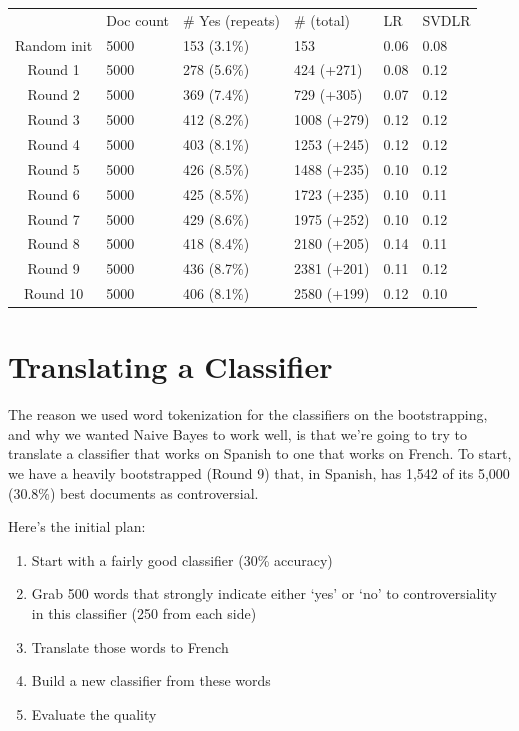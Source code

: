 \documentclass[11pt]{article} %
\begin{document}
\begin{tabular}{|c|*{5}{l|}}
\rowcolor{gray!50} & Doc count & \# Yes (repeats) & \# (total) & LR & SVDLR \\
Random init & 5000 & 153 (3.1\%) & 153 & 0.06 & 0.08 \\
Round 1 & 5000 & 278 (5.6\%) & 424 (+271) & 0.08 & 0.12 \\
Round 2 & 5000 & 369 (7.4\%) & 729 (+305) & 0.07 & 0.12 \\
Round 3 & 5000 & 412 (8.2\%) & 1008 (+279) & 0.12 & 0.12 \\
Round 4 & 5000 & 403 (8.1\%) & 1253 (+245) & 0.12 & 0.12 \\
Round 5 & 5000 & 426 (8.5\%) & 1488 (+235) & 0.10 & 0.12 \\
Round 6 & 5000 & 425 (8.5\%) & 1723 (+235) & 0.10 & 0.11 \\
Round 7 & 5000 & 429 (8.6\%) & 1975 (+252) & 0.10 & 0.12 \\
Round 8 & 5000 & 418 (8.4\%) & 2180 (+205) & 0.14 & 0.11 \\
Round 9 & 5000 & 436 (8.7\%) & 2381 (+201) & 0.11 & 0.12 \\
Round 10 & 5000 & 406 (8.1\%) & 2580 (+199) & 0.12 & 0.10 \\
\end{tabular}


\section{Translating a Classifier}
The reason we used word tokenization for the classifiers on the bootstrapping, and why we wanted Naive Bayes to work well, is that we're going to try to translate a classifier that works on Spanish to one that works on French. To start, we have a heavily bootstrapped (Round 9) that, in Spanish, has 1,542 of its 5,000 (30.8\%) best documents as controversial.

Here's the initial plan:
\begin{enumerate}
\item Start with a fairly good classifier (30\% accuracy)
\item Grab 500 words that strongly indicate either `yes' or `no' to controversiality in this classifier (250 from each side) 
\item Translate those words to French
\item Build a new classifier from these words
\item Evaluate the quality
\end{enumerate}
\end{document}
